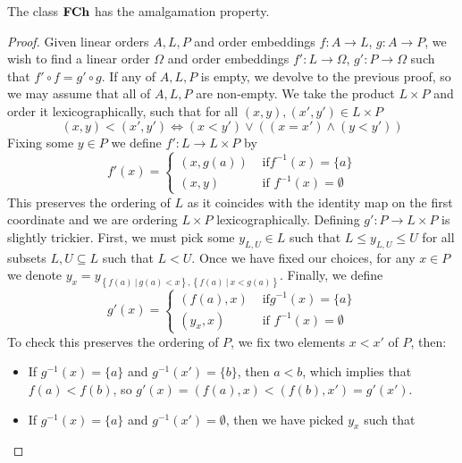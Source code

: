 \begin{prop}
  The class $\textbf{FCh}$ has the amalgamation property.
\end{prop}
\begin{proof}
  Given linear orders $A,L,P$ and order embeddings $f : A \to L$, $g : A \to P$, we wish to
  find a linear order $\Omega$ and order embeddings $f' : L \to \Omega$, $g' : P \to \Omega$ such
  that $f' \circ f = g' \circ g$. If any of $A,L,P$ is empty, we devolve to the previous proof,
  so we may assume that all of $A,L,P$ are non-empty. We take the product $L \times P$ and
  order it lexicographically, such that for all $(x,y), (x',y') \in L \times P$
  \begin{equation*}
    (x,y) < (x',y') \iff (x < y') \lor ((x = x') \land (y < y'))
  \end{equation*}
  Fixing some $y \in P$ we define $f' : L \to L \times P$ by
  \begin{equation*}
    f'(x) = \begin{cases}
      (x, g(a)) & \text{ if} f^{-1}(x) = \{a\} \\
      (x, y)    & \text{ if } f^{-1}(x) = \emptyset
    \end{cases}
  \end{equation*}
  This preserves the ordering of $L$ as it coincides with the identity map on the first coordinate
  and we are ordering $L \times P$ lexicographically.
  Defining $g' : P \to L \times P$ is slightly trickier. First, we must pick some $y_{L,U} \in L$
  such that $L \leq y_{L,U} \leq U$ for all subsets $L,U \subseteq L$ such that $L < U$. Once
  we have fixed our choices, for any $x \in P$ we denote
  $y_x =  y_{\left\{f(a)\ |\ g(a) < x\right\}, \left\{f(a)\ |\ x < g(a)\right\}}$.
  Finally, we define
  \begin{equation*}
    g'(x) = \begin{cases}
      (f(a), x) & \text{ if} g^{-1}(x) = \{a\} \\
      (y_x, x)  & \text{ if } f^{-1}(x) = \emptyset
    \end{cases}
  \end{equation*}
  To check this preserves the ordering of $P$, we fix two elements $x < x'$ of $P$, then:
  \begin{itemize}
    \item If $g^{-1}(x) = \{a\}$ and $g^{-1}(x') = \{b\}$, then $a < b$, which implies that
      $f(a) < f(b)$, so $g'(x) = (f(a),x) < (f(b),x') = g'(x')$.
    \item If $g^{-1}(x) = \{a\}$ and $g^{-1}(x') = \emptyset$, then we have picked $y_x$ such that

\end{itemize}
\end{proof}

